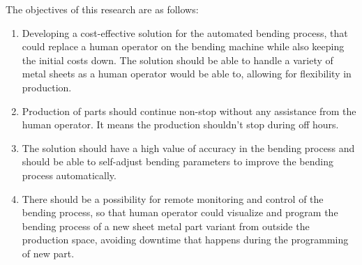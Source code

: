 The objectives of this research are as follows:
\begin{enumerate}
    \item Developing a cost-effective solution for the automated bending process, that could replace a human operator on the bending machine while also keeping the initial costs down. The solution should be able to handle a variety of metal sheets as a human operator would be able to, allowing for flexibility in production.
    \item Production of parts should continue non-stop without any assistance from the human operator. It means the production shouldn't stop during off hours.
    \item The solution should have a high value of accuracy in the bending process and should be able to self-adjust bending parameters to improve the bending process automatically.
    \item There should be a possibility for remote monitoring and control of the bending process, so that human operator could visualize and program the bending process of a new sheet metal part variant from outside the production space, avoiding downtime that happens during the programming of new part.
\end{enumerate}